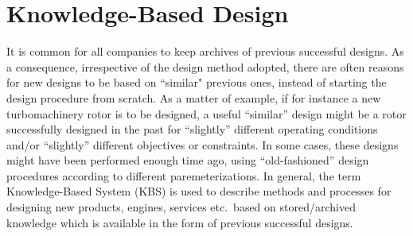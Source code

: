 \chapter{Knowledge-Based Design} %

\ifpdf
    \graphicspath{{3/figures/PNG/}{3ures/PDF/}{2.5/figures/}}
\else
    \graphicspath{{3/figures/EPS/}{3/figures/}}
\fi



\label{KBDchapter}
It is common for all companies to keep archives of previous successful designs. As a consequence, irrespective of the design method adopted, there are often reasons for new designs to be based on ``similar" previous ones, instead of starting the design procedure from scratch. As a matter of example, if for instance a new turbomachinery rotor is to be designed, a useful ``similar'' design might be a rotor successfully  designed in the past for ``slightly'' different operating conditions and/or ``slightly'' different objectives or constraints. 
In some cases, these designs might have been performed enough time ago, using ``old-fashioned'' design procedures according to different paremeterizations. In general, the term Knowledge-Based System (KBS) \cite{Akerkar:2009:KS:1795845} is used to describe methods and processes for designing new products, engines, services etc.\ based on stored/archived knowledge which is available in the form of previous successful designs.                

